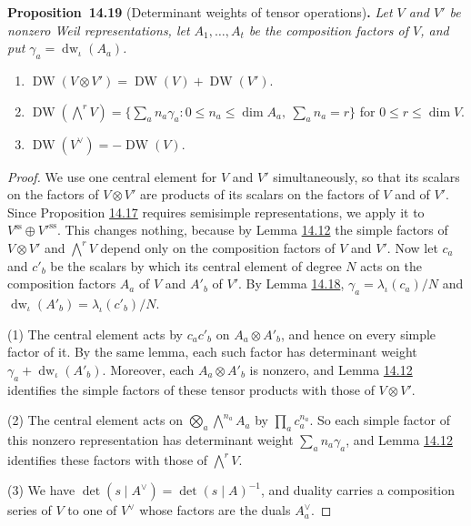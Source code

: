 \documentclass[11pt]{article}
\newenvironment{bpstatement}[2]{\par\addvspace{0.6\baselineskip}\noindent\textbf{#1}#2\textbf{.}\enspace\ignorespaces}
  {\par\addvspace{0.4\baselineskip}}
\newenvironment{bpstatementit}[2]{\begin{bpstatement}{#1}{#2}\itshape\ignorespaces}{\end{bpstatement}}
\begin{document}
\label{bp99}%
\begin{bpstatementit}{Proposition~14.19}{ (Determinant weights of tensor operations)}
Let \(V\) and \(V'\) be nonzero Weil representations, let \(A_1,\ldots,A_t\) be the composition factors of \(V\), and put \(\gamma_a=\operatorname{dw}_\iota(A_a)\).

\begin{enumerate}
\item \(\operatorname{DW}(V\otimes V')=\operatorname{DW}(V)+\operatorname{DW}(V')\).
\item \(\operatorname{DW}(\bigwedge^rV)=\bigl\{\sum_an_a\gamma_a :
      0\le n_a\le\dim A_a,\ \sum_an_a=r\bigr\}\) for \(0\le r\le\dim V\).
\item \(\operatorname{DW}(V^\vee)=-\operatorname{DW}(V)\).
\end{enumerate}
\end{bpstatementit}

\begin{proof}[{Proof}]\label{bp100}%
We use one central element for \(V\) and \(V'\) simultaneously, so that its scalars on the factors of \(V\otimes V'\) are products of its scalars on the factors of \(V\) and of \(V'\). Since Proposition \hyperref[bp92]{14.17} requires semisimple representations, we apply it to \(V^{\mathrm{ss}}\oplus V'^{\mathrm{ss}}\). This changes nothing, because by Lemma \hyperref[bp78]{14.12} the simple factors of \(V\otimes V'\) and \(\bigwedge^rV\) depend only on the composition factors of \(V\) and \(V'\). Now let \(c_a\) and \(c'_b\) be the scalars by which its central element of degree \(N\) acts on the composition factors \(A_a\) of \(V\) and \(A'_b\) of \(V'\). By Lemma \hyperref[bp96]{14.18}, \(\gamma_a=\lambda_\iota(c_a)/N\) and \(\operatorname{dw}_\iota(A'_b)=\lambda_\iota(c'_b)/N\).

(1) The central element acts by \(c_ac'_b\) on \(A_a\otimes A'_b\), and hence on every simple factor of it. By the same lemma, each such factor has determinant weight \(\gamma_a+\operatorname{dw}_\iota(A'_b)\). Moreover, each \(A_a\otimes A'_b\) is nonzero, and Lemma \hyperref[bp78]{14.12} identifies the simple factors of these tensor products with those of \(V\otimes V'\).

(2) The central element acts on \(\bigotimes_a\bigwedge^{n_a}A_a\) by \(\prod_ac_a^{n_a}\). So each simple factor of this nonzero representation has determinant weight \(\sum_an_a\gamma_a\), and Lemma \hyperref[bp78]{14.12} identifies these factors with those of \(\bigwedge^rV\).

(3) We have \(\det(s\mid A^\vee)=\det(s\mid A)^{-1}\), and duality carries a composition series of \(V\) to one of \(V^\vee\) whose factors are the duals \(A_a^\vee\).
\end{proof}
\end{document}
